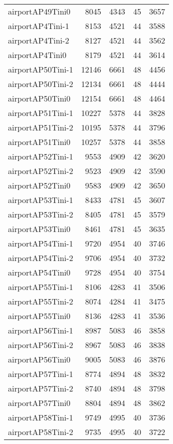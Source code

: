 \begin{longtable}{lrrrr}
airportAP49Tini0 & 8045 & 4343 & 45 & 3657 \\
airportAP4Tini-1 & 8153 & 4521 & 44 & 3588 \\
airportAP4Tini-2 & 8127 & 4521 & 44 & 3562 \\
airportAP4Tini0 & 8179 & 4521 & 44 & 3614 \\
airportAP50Tini-1 & 12146 & 6661 & 48 & 4456 \\
airportAP50Tini-2 & 12134 & 6661 & 48 & 4444 \\
airportAP50Tini0 & 12154 & 6661 & 48 & 4464 \\
airportAP51Tini-1 & 10227 & 5378 & 44 & 3828 \\
airportAP51Tini-2 & 10195 & 5378 & 44 & 3796 \\
airportAP51Tini0 & 10257 & 5378 & 44 & 3858 \\
airportAP52Tini-1 & 9553 & 4909 & 42 & 3620 \\
airportAP52Tini-2 & 9523 & 4909 & 42 & 3590 \\
airportAP52Tini0 & 9583 & 4909 & 42 & 3650 \\
airportAP53Tini-1 & 8433 & 4781 & 45 & 3607 \\
airportAP53Tini-2 & 8405 & 4781 & 45 & 3579 \\
airportAP53Tini0 & 8461 & 4781 & 45 & 3635 \\
airportAP54Tini-1 & 9720 & 4954 & 40 & 3746 \\
airportAP54Tini-2 & 9706 & 4954 & 40 & 3732 \\
airportAP54Tini0 & 9728 & 4954 & 40 & 3754 \\
airportAP55Tini-1 & 8106 & 4283 & 41 & 3506 \\
airportAP55Tini-2 & 8074 & 4284 & 41 & 3475 \\
airportAP55Tini0 & 8136 & 4283 & 41 & 3536 \\
airportAP56Tini-1 & 8987 & 5083 & 46 & 3858 \\
airportAP56Tini-2 & 8967 & 5083 & 46 & 3838 \\
airportAP56Tini0 & 9005 & 5083 & 46 & 3876 \\
airportAP57Tini-1 & 8774 & 4894 & 48 & 3832 \\
airportAP57Tini-2 & 8740 & 4894 & 48 & 3798 \\
airportAP57Tini0 & 8804 & 4894 & 48 & 3862 \\
airportAP58Tini-1 & 9749 & 4995 & 40 & 3736 \\
airportAP58Tini-2 & 9735 & 4995 & 40 & 3722 \\

\end{longtable}
